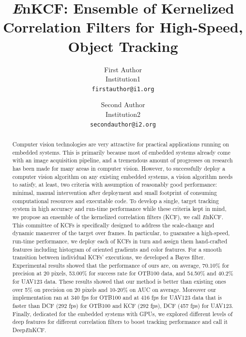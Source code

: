 \documentclass[10pt,twocolumn,letterpaper]{article}
\begin{document}
\title{{\it E}nKCF: Ensemble of Kernelized Correlation Filters for
  High-Speed, Object Tracking}

\author{First Author \\
Institution1\\
{\tt\small firstauthor@i1.org}
\and
Second Author \\
Institution2\\
{\tt\small secondauthor@i2.org}
}

\maketitle
\ifwacvfinal\thispagestyle{empty}\fi

\begin{abstract}
Computer vision technologies are very attractive for practical
applications running on embedded systems. This is primarily because
most of embedded systems already come with an image acquisition
pipeline, and a tremendous amount of progresses on research has been
made for many areas in computer vision. However, to successfully
deploy a computer vision algorithm on any existing embedded systems, a
vision algorithm needs to satisfy, at least, two criteria with
assumption of reasonably good performance: minimal, manual
intervention after deployment and small footprint of consuming
computational resources and executable code. To develop a single,
target tracking system in high accuracy and run-time performance while
these criteria kept in mind, we propose an ensemble of the kernelized
correlation filters (KCF), we call {\it E}nKCF. This committee of KCFs
is specifically designed to address the scale-change and dynamic
maneuver of the target over frames. In particular, to guarantee a
high-speed, run-time performance, we deploy each of KCFs in turn and assign 
them hand-crafted features including histogram of oriented gradients and color features.
For a smooth transition between individual KCFs' executions, we developed
a Bayes filter. Experimental results showed that the performance of
ours are, on average, 70.10\% for precision at 20 pixels, 53.00\% for
success rate for OTB100 data, and 54.50\% and 40.2\% for UAV123
data. These results showed that our method is better than existing
ones over 5\% on precision on 20 pixels and 10-20\% on AUC on
average. Moreover our implementation ran at 340 fps for OTB100 and at
416 fps for UAV123 data that is faster than DCF (292 fps) for OTB100
and KCF (292 fps), DCF (457 fps) for UAV123. Finally, dedicated for the embedded
systems with GPUs, we explored different levels of deep features for different
correlation filters to boost tracking performance and call it Deep{\it E}nKCF. 
\end{abstract}
\end{document}
